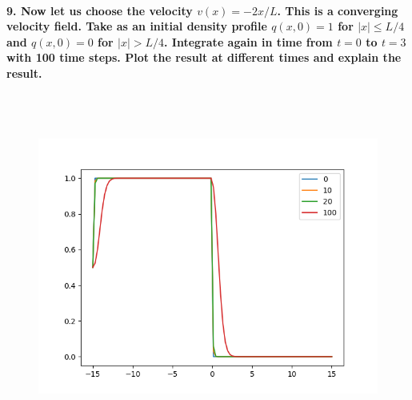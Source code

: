 \paragraph{9. Now let us choose the velocity $v(x)=-2x/L$. 
    This is a converging velocity field. Take as an initial 
    density profile $q(x, 0)=1$ for $|x|\le L/4$ and 
    $q(x,0)=0$ for $|x|>L/4$. Integrate again in time from 
    $t=0$ to $t=3$ with 100 time steps. Plot the result at 
    different times and explain the result.
} \ \\
    \\
    \begin{figure}[h!]
        \centering
        \includegraphics[width=\textwidth]{../figures/2.png}
        \caption{}
    \end{figure} \ \\ 
